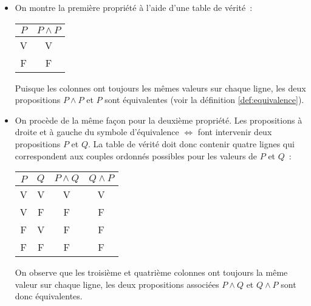\documentclass[10pt,notheorems]{beamer}
\theoremstyle{plain}
\theoremstyle{definition} %
\begin{document}
\begin{notes}
  \begin{itemize}

  \item On montre la première propriété à l'aide d'une table de
    vérité~:
    \begin{table}
      \centering
      \begin{tabular}[H]{|c|c|}
        \hline
        $P$ & $P \land P$ \\ \hline
        V & V \\
        F & F \\
        \hline\hline
      \end{tabular}
    \end{table}
    Puisque les colonnes ont toujours les mêmes valeurs sur chaque
    ligne, les deux propositions $P\land P$ et $P$ sont équivalentes
    (voir la définition \hyperlink{slide_equivalence_logique_1}{\ref{def:equivalence}}).

  \item On procède de la même façon pour la deuxième propriété. Les
    propositions à droite et à gauche du symbole d'équivalence
    $\Leftrightarrow$ font intervenir deux propositions $P$ et
    $Q$. La table de vérité doit donc contenir quatre lignes qui
    correspondent aux couples ordonnés possibles pour les
    valeurs de $P$ et $Q$~:
    \begin{table}[H]
      \centering
      \begin{tabular}[H]{|cc|cc|}
        \hline
        $P$ & $Q$ & $P \land Q$ & $Q \land P$\\ \hline
        V & V & V & V\\
        V & F & F & F\\
        F & V & F & F\\
        F & F & F & F \\
        \hline\hline
      \end{tabular}
    \end{table}
    On observe que les troisième et quatrième colonnes ont toujours
    la même valeur sur chaque ligne, les deux propositions associées
    $P \land Q$ et $Q \land P$ sont donc
    équivalentes.


\end{itemize}
\end{notes}
\end{document}

